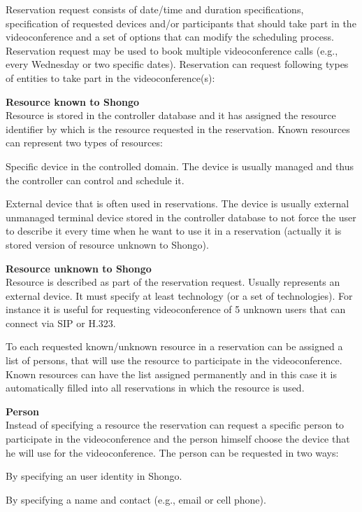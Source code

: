 Reservation request consists of date/time and duration specifications, specification of requested devices and/or participants that should take part in the videoconference and a set of options that can modify the scheduling process. Reservation request may be used to book multiple videoconference calls (e.g., every Wednesday or two specific dates). Reservation can request following types of entities to take part in the videoconference(s):
\begin{compactenum}
\item \textbf{Resource known to Shongo} \\
  Resource is stored in the controller database and it has assigned 
  the resource identifier by which is the resource requested in 
  the reservation. Known resources can represent two types of resources:
  \begin{compactenum}
  \item Specific device in the controlled domain. The device is usually 
  managed and thus the controller can control and schedule it.
  \item External device that is often used in reservations. The device is 
  usually external unmanaged terminal device stored in the controller database
  to not force the user to describe it every time when he want to use it in 
  a reservation (actually it is stored version of resource unknown to Shongo).
  \end{compactenum}
\item \textbf{Resource unknown to Shongo} \\
  Resource is described as part of the reservation request. Usually 
  represents an external device. It must specify at least technology (or a set 
  of technologies). For instance it is useful for requesting videoconference 
  of 5 unknown users that can connect via SIP or H.323.
  
  To each requested known/unknown resource in a reservation can be assigned a 
  list of persons, that will use the resource to participate in the 
  videoconference. Known resources can have the list assigned permanently 
  and in this case it is automatically filled into all reservations in which 
  the resource is used.  
\item \textbf{Person} \\
  Instead of specifying a resource the reservation can request a specific 
  person to participate in the videoconference and the person himself choose
  the device that he will use for the videoconference. The person can be 
  requested in two ways:
  \begin{compactenum}
  \item By specifying an user identity in Shongo.
  \item By specifying a name and contact (e.g., email or cell phone).
  \end{compactenum}
\end{compactenum}
